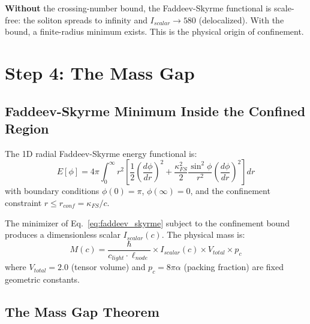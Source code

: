 \noindent
\textbf{Without} the crossing-number bound, the Faddeev-Skyrme
functional is scale-free: the soliton spreads to infinity and
$I_{scalar} \to 580$ (delocalized). With the bound, a finite-radius
minimum exists.  This is the physical origin of confinement.

\section{Step 4: The Mass Gap}
\label{sec:mass_gap_proof}

\subsection{Faddeev-Skyrme Minimum Inside the Confined Region}

The 1D radial Faddeev-Skyrme energy functional is:
\begin{equation}
    E[\phi] = 4\pi\int_0^\infty r^2 \left[
    \frac{1}{2}\left(\frac{d\phi}{dr}\right)^{\!2}
    + \frac{\kappa_{FS}^2}{2}\frac{\sin^2\phi}{r^2}
    \left(\frac{d\phi}{dr}\right)^{\!2}
    \right] dr
    \label{eq:faddeev_skyrme}
\end{equation}
with boundary conditions $\phi(0) = \pi$, $\phi(\infty) = 0$, and the
confinement constraint $r \le r_{conf} = \kappa_{FS}/c$.

The minimizer of Eq.~\ref{eq:faddeev_skyrme} subject to the confinement
bound produces a dimensionless scalar $I_{scalar}(c)$.  The physical
mass is:
\begin{equation}
    M(c) = \frac{\hbar}{c_{light} \cdot \ell_{node}}
    \times I_{scalar}(c) \times V_{total} \times p_c
    \label{eq:mass_from_scalar}
\end{equation}
where $V_{total} = 2.0$ (tensor volume) and
$p_c = 8\pi\alpha$ (packing fraction) are fixed geometric constants.

\subsection{The Mass Gap Theorem}

\noindent{}

